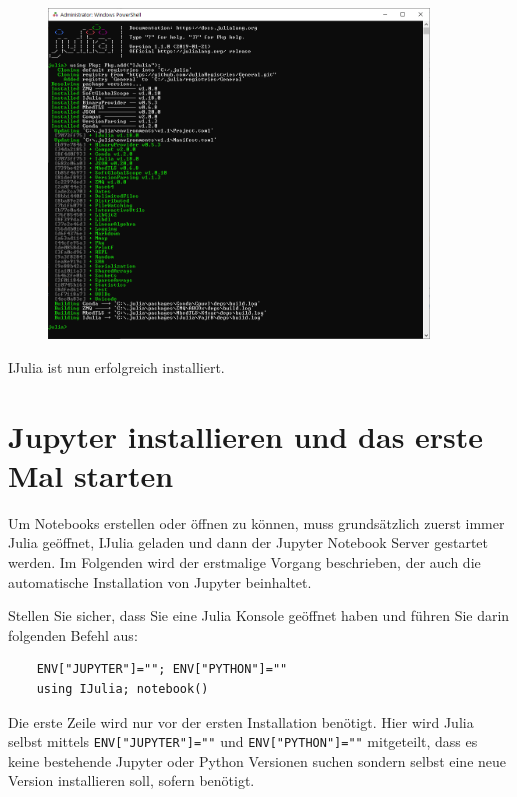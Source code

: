 \documentclass[11pt, a4paper]{scrartcl}
\begin{document}
	\begin{figure}[h!]
	\centering
	\includegraphics[width=0.9\textwidth]{imgs/IJulia_install.png}
	\end{figure}

	IJulia ist nun erfolgreich installiert.
	
	
	
	
	
	
	
	
	
	
	
	
	
	\section{Jupyter installieren und das erste Mal starten}
	
	Um Notebooks erstellen oder öffnen zu können, muss grundsätzlich zuerst immer Julia geöffnet, IJulia geladen und dann der Jupyter Notebook Server gestartet werden. Im Folgenden wird der erstmalige Vorgang beschrieben, der auch die automatische Installation von Jupyter beinhaltet. 
	
	Stellen Sie sicher, dass Sie eine Julia Konsole geöffnet haben und führen Sie darin folgenden Befehl aus:
	
	\begin{lstlisting}
	ENV["JUPYTER"]=""; ENV["PYTHON"]=""
	using IJulia; notebook()
	\end{lstlisting}
	
	Die erste Zeile wird nur vor der ersten Installation benötigt. Hier wird Julia selbst mittels \texttt{ENV["JUPYTER"]=""} und \texttt{ENV["PYTHON"]=""} mitgeteilt, dass es keine bestehende Jupyter oder Python Versionen suchen sondern selbst eine neue Version installieren soll, sofern benötigt.
	
\end{document}
